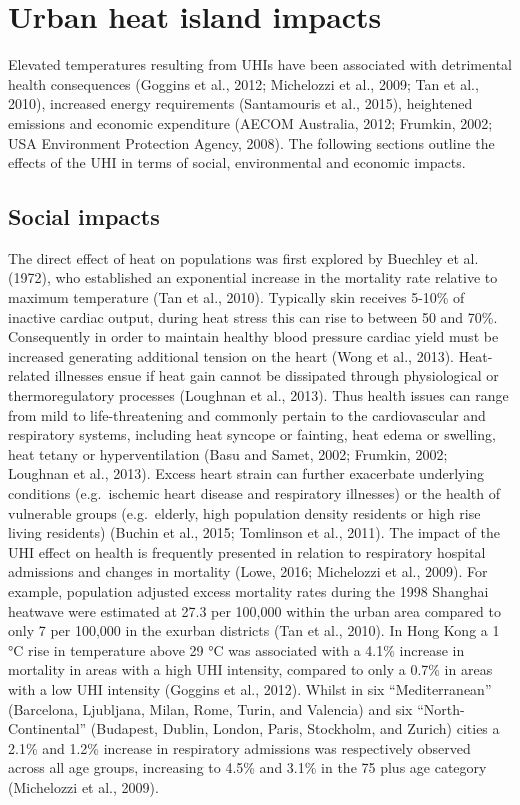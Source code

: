 \documentclass[]{book}
\begin{document}
\section{Urban heat island impacts}\label{urban-heat-island-impacts}

Elevated temperatures resulting from UHIs have been associated with
detrimental health consequences (Goggins et al., 2012; Michelozzi et
al., 2009; Tan et al., 2010), increased energy requirements (Santamouris
et al., 2015), heightened emissions and economic expenditure (AECOM
Australia, 2012; Frumkin, 2002; USA Environment Protection Agency,
2008). The following sections outline the effects of the UHI in terms of
social, environmental and economic impacts.

\subsection{Social impacts}\label{social-impacts}

The direct effect of heat on populations was first explored by Buechley
et al. (1972), who established an exponential increase in the mortality
rate relative to maximum temperature (Tan et al., 2010). Typically skin
receives 5-10\% of inactive cardiac output, during heat stress this can
rise to between 50 and 70\%. Consequently in order to maintain healthy
blood pressure cardiac yield must be increased generating additional
tension on the heart (Wong et al., 2013). Heat-related illnesses ensue
if heat gain cannot be dissipated through physiological or
thermoregulatory processes (Loughnan et al., 2013). Thus health issues
can range from mild to life-threatening and commonly pertain to the
cardiovascular and respiratory systems, including heat syncope or
fainting, heat edema or swelling, heat tetany or hyperventilation (Basu
and Samet, 2002; Frumkin, 2002; Loughnan et al., 2013). Excess heart
strain can further exacerbate underlying conditions (e.g.~ischemic heart
disease and respiratory illnesses) or the health of vulnerable groups
(e.g.~elderly, high population density residents or high rise living
residents) (Buchin et al., 2015; Tomlinson et al., 2011). The impact of
the UHI effect on health is frequently presented in relation to
respiratory hospital admissions and changes in mortality (Lowe, 2016;
Michelozzi et al., 2009). For example, population adjusted excess
mortality rates during the 1998 Shanghai heatwave were estimated at 27.3
per 100,000 within the urban area compared to only 7 per 100,000 in the
exurban districts (Tan et al., 2010). In Hong Kong a 1 °C rise in
temperature above 29 °C was associated with a 4.1\% increase in
mortality in areas with a high UHI intensity, compared to only a 0.7\%
in areas with a low UHI intensity (Goggins et al., 2012). Whilst in six
``Mediterranean'' (Barcelona, Ljubljana, Milan, Rome, Turin, and
Valencia) and six ``North-Continental'' (Budapest, Dublin, London,
Paris, Stockholm, and Zurich) cities a 2.1\% and 1.2\% increase in
respiratory admissions was respectively observed across all age groups,
increasing to 4.5\% and 3.1\% in the 75 plus age category (Michelozzi et
al., 2009).
\end{document}
